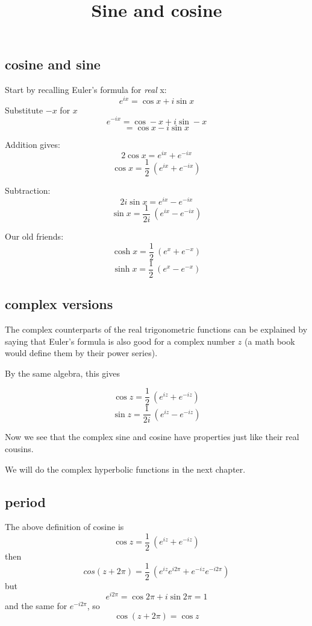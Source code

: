 \documentclass[11pt, oneside]{article}
\title{Sine and cosine}
\date{}
\begin{document}
\maketitle
\Large


\subsection*{cosine and sine}

Start by recalling Euler's formula for \emph{real} x:
\[ e^{ix} = \cos x + i \sin x \]
Substitute $-x$ for $x$
\[ e^{-ix} = \cos -x + i \sin -x \]
\[ = \cos x - i \sin x \]

Addition gives:
\[ 2 \cos x = e^{ix} + e^{-ix} \]
\[ \cos x = \frac{1}{2} \ (e^{ix} + e^{-ix}) \]

Subtraction:
\[ 2i \sin x = e^{ix} - e^{-ix} \]
\[ \sin x = \frac{1}{2i} \ (e^{ix} - e^{-ix}) \]

Our old friends:
\[ \cosh x =  \frac{1}{2} \ (e^{x}+ e^{-x}) \]
\[ \sinh x =  \frac{1}{2} \ (e^{x} - e^{-x}) \]

\subsection*{complex versions}

The complex counterparts of the real trigonometric functions can be explained by saying that Euler's formula is also good for a complex number $z$ (a math book would define them by their power series).  

By the same algebra, this gives

\[ \cos z = \frac{1}{2} \ (e^{iz} + e^{-iz}) \]
\[ \sin z = \frac{1}{2i} \ (e^{iz} - e^{-iz}) \]

Now we see that the complex sine and cosine have properties just like their real cousins.

We will do the complex hyperbolic functions in the next chapter.

\subsection*{period}

The above definition of cosine is
\[ \cos z = \frac{1}{2} \ (e^{iz} + e^{-iz}) \]
then
\[ cos (z + 2 \pi) = \frac{1}{2} \ (e^{iz} e^{i2 \pi} + e^{-iz} e^{-i 2\pi}) \]
but
\[ e^{i 2 \pi} = \cos 2 \pi + i \sin 2 \pi = 1 \]
and the same for $e^{-i 2 \pi}$, so
\[ \cos (z + 2\pi) = \cos z \]
\end{document}
